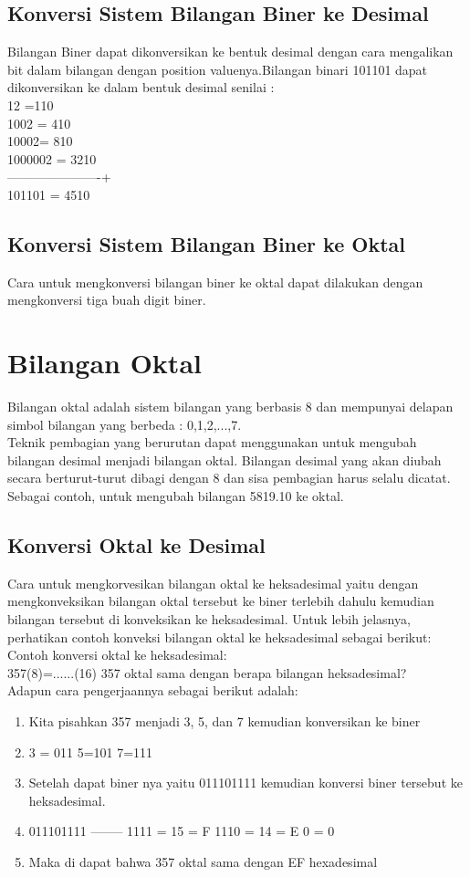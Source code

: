 \subsection{Konversi Sistem Bilangan Biner ke Desimal}
Bilangan Biner dapat dikonversikan ke bentuk desimal dengan cara mengalikan bit dalam bilangan dengan position valuenya.Bilangan binari 101101 dapat dikonversikan ke dalam bentuk desimal senilai :
\\  12	=110\\
1002	= 410\\
10002= 810\\
1000002 = 3210\\
----------------------+\\
101101 = 4510\\
\subsection{Konversi Sistem Bilangan Biner ke Oktal}
Cara untuk mengkonversi bilangan biner ke oktal dapat dilakukan dengan mengkonversi tiga buah digit biner.

\section{Bilangan Oktal} %
Bilangan oktal adalah sistem bilangan yang berbasis 8 dan mempunyai delapan simbol bilangan yang berbeda : 0,1,2,...,7.
\\
	Teknik pembagian yang berurutan dapat menggunakan untuk mengubah bilangan desimal menjadi bilangan oktal. Bilangan desimal yang akan diubah secara berturut-turut dibagi dengan 8 dan sisa pembagian harus selalu dicatat. Sebagai contoh, untuk mengubah bilangan 5819.10 ke oktal.
\subsection{Konversi Oktal ke Desimal}
Cara untuk mengkorvesikan bilangan oktal ke heksadesimal yaitu dengan mengkonveksikan bilangan oktal tersebut ke biner terlebih dahulu kemudian bilangan tersebut di konveksikan ke heksadesimal. Untuk lebih jelasnya, perhatikan contoh konveksi bilangan oktal ke heksadesimal sebagai berikut:
\\	Contoh konversi oktal ke heksadesimal:
\\357(8)=......(16) 357 oktal sama dengan berapa bilangan heksadesimal?
\\Adapun cara pengerjaannya sebagai berikut adalah:
\begin{enumerate}
	\item Kita pisahkan 357 menjadi 3, 5, dan 7 kemudian konversikan ke biner 
	\item 3 = 011		5=101		7=111
	\item Setelah dapat biner nya yaitu 011101111 kemudian konversi biner tersebut ke heksadesimal. 
	\item 011101111  -------- 1111 = 15 = F            1110 = 14 = E       0 = 0
	\item Maka di dapat bahwa 357 oktal sama dengan EF hexadesimal	
\end{enumerate}



